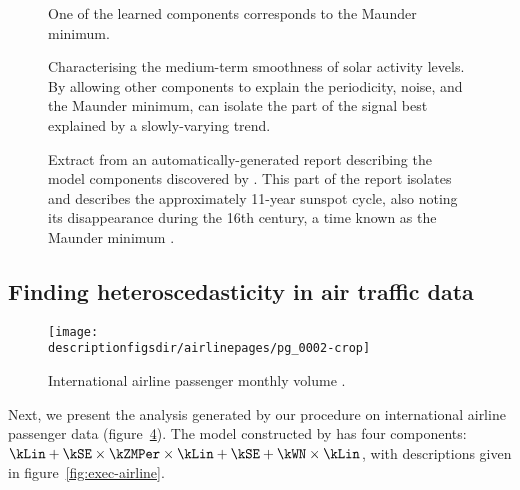 \begin{figure}[ht]
\centering
{}
\caption[Automatic identification of the Maunder minimum.]{One of the learned components corresponds to the Maunder minimum.}
\label{fig:maunder}
\end{figure}

\begin{figure}[h!]
\centering
{}
\caption[Characterising the medium-term smoothness of solar activity levels.]{Characterising the medium-term smoothness of solar activity levels.  By allowing other components to explain the periodicity, noise, and the Maunder minimum, \procedurename{} can isolate the part of the signal best explained by a slowly-varying trend.}
\label{fig:smooth}
\end{figure}

\begin{figure}[ht]
\centering
{}
\caption[Automatic identification of solar cycles.]{
Extract from an automatically-generated report describing the model components discovered by \procedurename{}.
This part of the report isolates and describes the approximately 11-year sunspot cycle, also noting its disappearance during the 16th century, a time known as the Maunder minimum \citep{Lean1995-vp}.
}
\label{fig:periodic}
\end{figure}

\subsection{Finding heteroscedasticity in air traffic data}
\label{sec:airline}

\begin{figure}[h]
\centering
\texttt{[image: \\descriptionfigsdir/airlinepages/pg\_0002-crop]}
\caption[Airline data.]{
International airline passenger monthly volume \citep[e.g.][]{Box1976-qk}.}
\label{fig:airline}
\end{figure}

Next, we present the analysis generated by our procedure on international airline passenger data (figure~\ref{fig:airline}).
The model constructed by \procedurename{} has four components: $\kLin + \kSE \times \kZMPer \times \kLin + \kSE + \kWN \times \kLin$, with descriptions given in figure~\ref{fig:exec-airline}.

